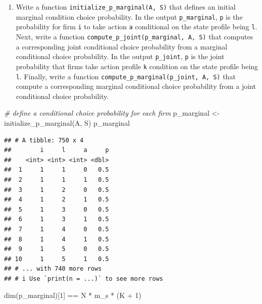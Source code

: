 \documentclass[
]{book}
\newenvironment{Shaded}{\begin{snugshade}}{\end{snugshade}}
\newcommand{\CommentTok}[1]{\textcolor[rgb]{0.56,0.35,0.01}{\textit{#1}}}
\newcommand{\DecValTok}[1]{\textcolor[rgb]{0.00,0.00,0.81}{#1}}
\newcommand{\FunctionTok}[1]{\textcolor[rgb]{0.00,0.00,0.00}{#1}}
\newcommand{\NormalTok}[1]{#1}
\newcommand{\OtherTok}[1]{\textcolor[rgb]{0.56,0.35,0.01}{#1}}
\newcommand{\SpecialCharTok}[1]{\textcolor[rgb]{0.00,0.00,0.00}{#1}}
\providecommand{\tightlist}{%
  \setlength{\itemsep}{0pt}\setlength{\parskip}{0pt}}
\begin{document}
\begin{enumerate}
\def\labelenumi{\arabic{enumi}.}
\setcounter{enumi}{4}
\tightlist
\item
  Write a function \texttt{initialize\_p\_marginal(A,\ S)} that defines an initial marginal condition choice probability. In the output \texttt{p\_marginal}, \texttt{p} is the probability for firm \texttt{i} to take action \texttt{a} conditional on the state profile being \texttt{l}. Next, write a function \texttt{compute\_p\_joint(p\_marginal,\ A,\ S)} that computes a corresponding joint conditional choice probability from a marginal conditional choice probability. In the output \texttt{p\_joint}, \texttt{p} is the joint probability that firms take action profile \texttt{k} condition on the state profile being \texttt{l}. Finally, write a function \texttt{compute\_p\_marginal(p\_joint,\ A,\ S)} that compute a corresponding marginal conditional choice probability from a joint conditional choice probability.
\end{enumerate}

\begin{Shaded}
\begin{Highlighting}[]
\CommentTok{\# define a conditional choice probability for each firm}
\NormalTok{p\_marginal }\OtherTok{\textless{}{-}} \FunctionTok{initialize\_p\_marginal}\NormalTok{(A, S)}
\NormalTok{p\_marginal}
\end{Highlighting}
\end{Shaded}

\begin{verbatim}
## # A tibble: 750 x 4
##        i     l     a     p
##    <int> <int> <int> <dbl>
##  1     1     1     0   0.5
##  2     1     1     1   0.5
##  3     1     2     0   0.5
##  4     1     2     1   0.5
##  5     1     3     0   0.5
##  6     1     3     1   0.5
##  7     1     4     0   0.5
##  8     1     4     1   0.5
##  9     1     5     0   0.5
## 10     1     5     1   0.5
## # ... with 740 more rows
## # i Use `print(n = ...)` to see more rows
\end{verbatim}

\begin{Shaded}
\begin{Highlighting}[]
\FunctionTok{dim}\NormalTok{(p\_marginal)[}\DecValTok{1}\NormalTok{] }\SpecialCharTok{==}\NormalTok{ N }\SpecialCharTok{*}\NormalTok{ m\_s }\SpecialCharTok{*}\NormalTok{ (K }\SpecialCharTok{+} \DecValTok{1}\NormalTok{)}
\end{Highlighting}
\end{Shaded}
\end{document}
